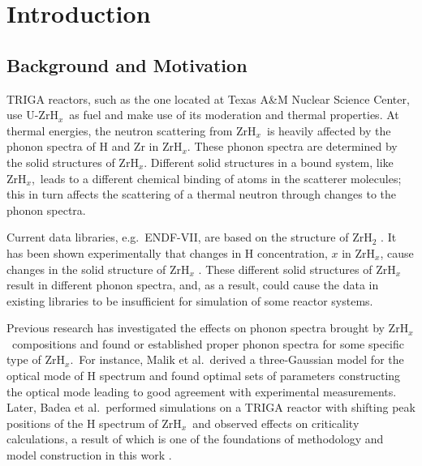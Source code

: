 \documentclass[review]{elsarticle}
\newcommand{\zh}{ZrH$_x$}
\newcommand{\tcr}[1]{{#1}}
\newcommand{\tcb}[1]{{#1}}
\begin{document}
\linenumbers

\section{Introduction}
\subsection{Background and Motivation}
TRIGA reactors, such as the one located at Texas A\&M Nuclear Science Center, use U-\zh~as fuel and make use of its moderation and thermal properties\cite{triga}. At thermal energies, the neutron scattering from \zh~is heavily affected by the phonon spectra of H and Zr in \zh. \tcb{These phonon spectra} are determined by the solid structures of \zh. \tcb{ Different solid structures in a bound system, like \zh,\ leads to a different chemical binding of atoms in the scatterer molecules; this in turn affects the scattering of a thermal neutron through changes to the phonon spectra.}

\tcb{Current data libraries, e.g.~ENDF-VII, are based on the structure of ZrH$_2$} \cite{Slaggie,NJOY,Macf}. \tcb{It has been shown experimentally that changes in H concentration, $x$ in \zh, cause changes in the solid structure of \zh}  \cite{Malik,evans}. \tcb{These different solid structures of \zh~ result in different phonon spectra,  and, as a result, could cause the data in existing libraries to be insufficient for simulation of some reactor systems}.



Previous research has investigated the effects on phonon spectra brought by \zh~compositions and found or established proper phonon spectra for some specific type of \zh.~For instance, Malik et al.~derived a three-Gaussian model for the optical mode of H spectrum and found optimal sets of parameters constructing the optical mode leading to good agreement with experimental measurements\cite{Malik}. Later, Badea et al.~performed simulations on a TRIGA reactor with shifting peak positions of the H spectrum of \zh~and observed effects on criticality calculations, a result of which is one of the foundations of methodology and model construction in this work \cite{Badea}.
\end{document}
